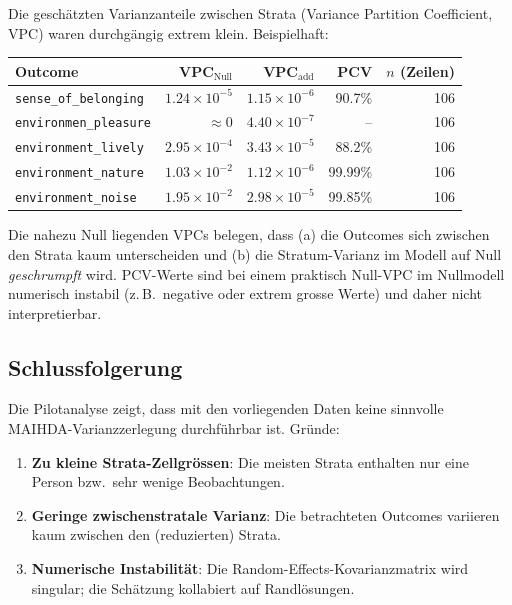 Die geschätzten Varianzanteile zwischen Strata (Variance Partition Coefficient, VPC) waren durchgängig extrem klein. Beispielhaft:

\begin{center}
\begin{tabular}{lrrrr}
\toprule
Outcome & VPC$_{\text{Null}}$ & VPC$_{\text{add}}$ & PCV & $n$ (Zeilen) \\
\midrule
\texttt{sense\_of\_belonging}      & $1.24\times 10^{-5}$ & $1.15\times 10^{-6}$ & 90.7\% & 106 \\
\texttt{environmen\_pleasure}      & $\approx 0$          & $4.40\times 10^{-7}$ & --      & 106 \\
\texttt{environment\_lively}       & $2.95\times 10^{-4}$ & $3.43\times 10^{-5}$ & 88.2\%  & 106 \\
\texttt{environment\_nature}       & $1.03\times 10^{-2}$ & $1.12\times 10^{-6}$ & 99.99\% & 106 \\
\texttt{environment\_noise}        & $1.95\times 10^{-2}$ & $2.98\times 10^{-5}$ & 99.85\% & 106 \\
\bottomrule
\end{tabular}
\end{center}

Die nahezu Null liegenden VPCs belegen, dass (a) die Outcomes sich zwischen den Strata kaum unterscheiden und (b) die Stratum-Varianz im Modell auf Null \emph{geschrumpft} wird. PCV-Werte sind bei einem praktisch Null-VPC im Nullmodell numerisch instabil (z.\,B.\ negative oder extrem grosse Werte) und daher nicht interpretierbar.

\subsection{Schlussfolgerung}
Die Pilotanalyse zeigt, dass mit den vorliegenden Daten keine sinnvolle MAIHDA-Varianzzerlegung durchführbar ist. Gründe:
\begin{enumerate}
    \item \textbf{Zu kleine Strata-Zellgrössen}: Die meisten Strata enthalten nur eine Person bzw.\ sehr wenige Beobachtungen.
    \item \textbf{Geringe zwischenstratale Varianz}: Die betrachteten Outcomes variieren kaum zwischen den (reduzierten) Strata.
    \item \textbf{Numerische Instabilität}: Die Random-Effects-Kovarianzmatrix wird singular; die Schätzung kollabiert auf Randlösungen.
\end{enumerate}

